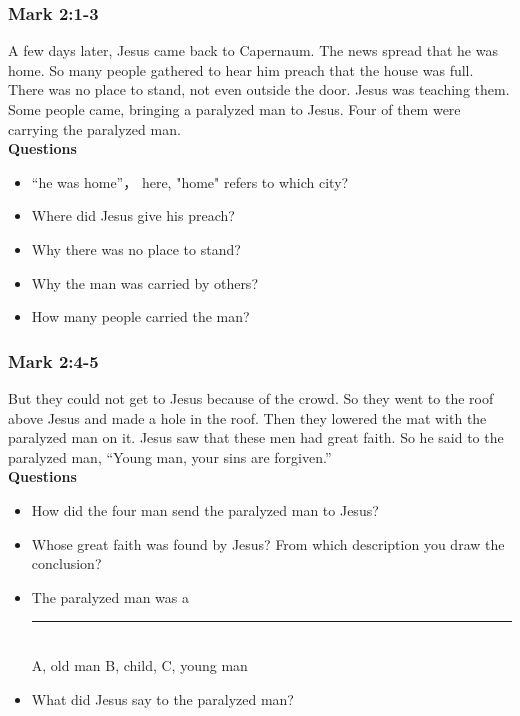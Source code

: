 \vspace{.25cm}
\subsubsection{\large{Mark 2:1-3}}
A few days later, Jesus came back to Capernaum. The news spread that he was home. So many people gathered to hear him preach that the house was full. There was no place to stand, not even outside the door. Jesus was teaching them. Some people came, bringing a paralyzed man to Jesus. Four of them were carrying the paralyzed man. \\
\vspace{.25cm}
\textbf{Questions}\vspace{-.5cm}
\begin{itemize}[noitemsep]
\item “he was home”， here, "home" refers to which city?
\item Where did Jesus give his preach?
\item Why there was no place to stand?
\item Why the man was carried by others?
\item How many people carried the man?
\end{itemize}

\vspace{.25cm}
\subsubsection{\large{Mark 2:4-5}}
But they could not get to Jesus because of the crowd. So they went to the roof above Jesus and made a hole in the roof. Then they lowered the mat with the paralyzed man on it. Jesus saw that these men had great faith. So he said to the paralyzed man, “Young man, your sins are forgiven.” \\
\vspace{.25cm}
\textbf{Questions}\vspace{-.5cm}
\begin{itemize}[noitemsep]
\item How did the four man send the paralyzed man to Jesus?
\item Whose great faith was found by Jesus? From which description you draw the conclusion?
\item The paralyzed man was a  \rule[0cm]{1cm}{0.4pt}\\
A, old man \hspace{1cm} B, child, \hspace{1cm} C, young man
\item What did Jesus say to the paralyzed man?
\end{itemize}

